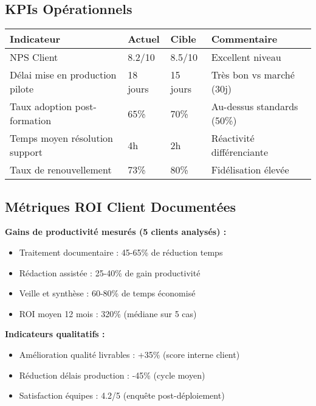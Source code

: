 \subsection{KPIs Opérationnels}

\begin{longtable}{@{}p{5cm}p{3cm}p{3cm}p{3cm}@{}}
\toprule
\textbf{Indicateur} & \textbf{Actuel} & \textbf{Cible} & \textbf{Commentaire} \\
\midrule
NPS Client & 8.2/10 & 8.5/10 & Excellent niveau \\
Délai mise en production pilote & 18 jours & 15 jours & Très bon vs marché (30j) \\
Taux adoption post-formation & 65\% & 70\% & Au-dessus standards (50\%) \\
Temps moyen résolution support & 4h & 2h & Réactivité différenciante \\
Taux de renouvellement & 73\% & 80\% & Fidélisation élevée \\
\bottomrule
\end{longtable}

\subsection{Métriques ROI Client Documentées}

\textbf{Gains de productivité mesurés (5 clients analysés) :}
\begin{itemize}
    \item Traitement documentaire : 45-65\% de réduction temps
    \item Rédaction assistée : 25-40\% de gain productivité
    \item Veille et synthèse : 60-80\% de temps économisé
    \item ROI moyen 12 mois : 320\% (médiane sur 5 cas)
\end{itemize}

\textbf{Indicateurs qualitatifs :}
\begin{itemize}
    \item Amélioration qualité livrables : +35\% (score interne client)
    \item Réduction délais production : -45\% (cycle moyen)
    \item Satisfaction équipes : 4.2/5 (enquête post-déploiement)
\end{itemize}
